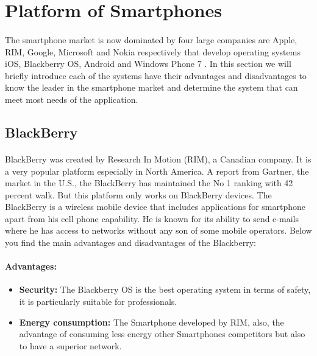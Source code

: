 \newpage
\section{Platform of Smartphones}
\paragraph{}
The smartphone market is now dominated by four large companies are Apple, RIM, Google, Microsoft
 and Nokia respectively that develop operating systems iOS, Blackberry OS,
Android and Windows Phone 7 . In this section we will briefly introduce each of the systems have their advantages and disadvantages 
to know the leader in the smartphone market and determine the system that can meet most needs of the application.
\subsection{BlackBerry}

\paragraph{}
BlackBerry was created by Research In Motion (RIM), a Canadian company. It is a very popular platform especially in North America. 
A report from Gartner, the market in the U.S., the BlackBerry has maintained the No
 1 ranking with 42 percent walk. But this platform only works on BlackBerry devices.
The BlackBerry is a wireless mobile device that includes applications for smartphone apart from his cell phone capability.
 He is known for its ability to send e-mails where he has access to networks without any son of some mobile operators.
Below you find the main advantages and disadvantages of the Blackberry:
\paragraph{Advantages:}
\begin{itemize}
 \item \textbf{Security: }The Blackberry OS is the best operating system in terms of safety, it is particularly suitable for professionals.
 \item \textbf{Energy consumption: }The Smartphone developed by RIM, also,
 the advantage of consuming less energy other Smartphones competitors but also to have a superior network.
\end{itemize}
